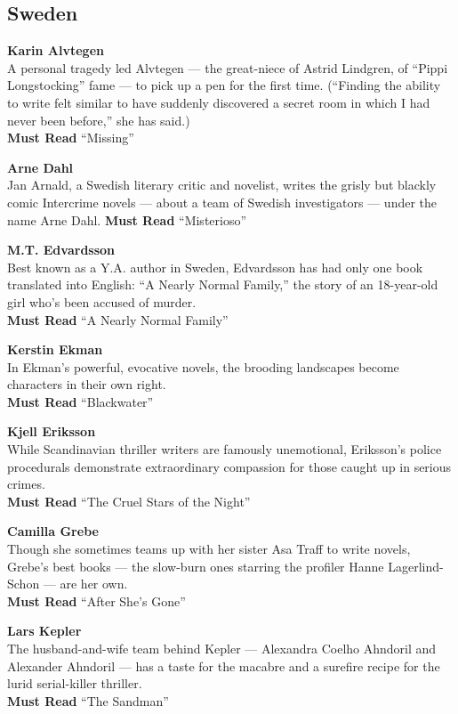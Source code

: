 \hypertarget{sweden}{%
\subsection{Sweden}\label{sweden}}

\textbf{Karin Alvtegen}\\
A personal tragedy led Alvtegen --- the great-niece of Astrid Lindgren,
of ``Pippi Longstocking'' fame --- to pick up a pen for the first time.
(``Finding the ability to write felt similar to have suddenly discovered
a secret room in which I had never been before,'' she has said.)\\
\textbf{Must Read} ``Missing''

\textbf{Arne Dahl}\\
Jan Arnald, a Swedish literary critic and novelist, writes the grisly
but blackly comic Intercrime novels --- about a team of Swedish
investigators --- under the name Arne Dahl. \textbf{Must Read}
``Misterioso''

\textbf{M.T. Edvardsson}\\
Best known as a Y.A. author in Sweden, Edvardsson has had only one book
translated into English: ``A Nearly Normal Family,'' the story of an
18-year-old girl who's been accused of murder.\\
\textbf{Must Read} ``A Nearly Normal Family''

\textbf{Kerstin Ekman}\\
In Ekman's powerful, evocative novels, the brooding landscapes become
characters in their own right.\\
\textbf{Must Read} ``Blackwater''

\textbf{Kjell Eriksson}\\
While Scandinavian thriller writers are famously unemotional, Eriksson's
police procedurals demonstrate extraordinary compassion for those caught
up in serious crimes.\\
\textbf{Must Read} ``The Cruel Stars of the Night''

\textbf{Camilla Grebe}\\
Though she sometimes teams up with her sister Asa Traff to write novels,
Grebe's best books --- the slow-burn ones starring the profiler Hanne
Lagerlind-Schon --- are her own.\\
\textbf{Must Read} ``After She's Gone''

\textbf{Lars Kepler}\\
The husband-and-wife team behind Kepler --- Alexandra Coelho Ahndoril
and Alexander Ahndoril --- has a taste for the macabre and a surefire
recipe for the lurid serial-killer thriller.\\
\textbf{Must Read} ``The Sandman''

